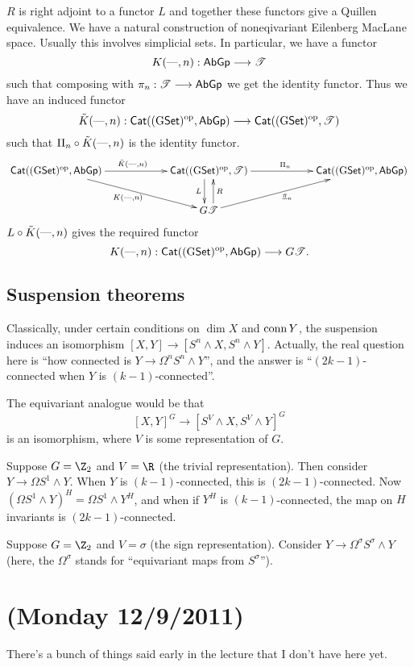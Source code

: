 \documentclass[11pt]{article}
\newcommand{\NewLecture}[3]{\section{#1 {\small(#2/#3/2011)}}}
\begin{document}
\begin{FirstNineLectures}
$R$ is right adjoint to a functor $L$ and together these functors give a Quillen equivalence. We have a natural construction of noneqivariant Eilenberg MacLane space. Usually this involves simplicial sets. In particular, we have a functor
\[K(\textup{---},n):\operatorname{{\mathsf{AbGp}}}\longrightarrow\mathscr{T}\]
such that composing with $\pi_n:\mathscr{T}\longrightarrow\operatorname{{\mathsf{AbGp}}}$ we get the identity functor. Thus we have an induced functor
\[\tilde{K}(\textup{---},n):\operatorname{{\mathsf{Cat}}}((\operatorname{{G\mathsf{Set}}})^{\textup{op}},\operatorname{{\mathsf{AbGp}}})\longrightarrow
\operatorname{{\mathsf{Cat}}}((\operatorname{{G\mathsf{Set}}})^{\textup{op}},\mathscr{T})\]
such that $\Pi_n\circ\tilde{K}(\textup{---},n)$ is the identity functor.
\[\xymatrixcolsep{5pc}\xymatrix{
\Cat
((\GSet)^{\textup{op}},\AbGp)
\ar[r]^{\tilde{K}(\DASH,n)}\ar[rd]_{K(\DASH,n)}
&\Cat
((\GSet)^{\textup{op}},\mathscr{T})\ar[r]^{\Pi_n}\ar@<-1ex>[d]_L
&\Cat
((\GSet)^{\textup{op}},\AbGp)\\
&G\mathscr{T}\ar@<-1ex>[u]_R\ar[ru]_{\underline{\pi}_n}&}\]
$L\circ\tilde{K}(\textup{---},n)$ gives the required functor
\[K(\textup{---},n):\operatorname{{\mathsf{Cat}}}((\operatorname{{G\mathsf{Set}}})^{\textup{op}},\operatorname{{\mathsf{AbGp}}})\longrightarrow
G\mathscr{T}.\]
\subsection*{Suspension theorems}
Classically, under certain conditions on $\dim X$ and $\operatorname{conn} Y$, the suspension induces an isomorphism $[X,Y]\to[S^n\wedge X,S^n\wedge Y]$. Actually, the real question here is ``how connected is $Y\to \Omega^nS^n\wedge Y$'', and the answer is ``$(2k-1)$-connected when $Y$ is $(k-1)$-connected''.

The equivariant analogue would be that
\[[X,Y]^G\to [S^V\wedge X,S^V\wedge Y]^G\]
is an isomorphism, where $V$ is some representation of $G$.
\begin{exmp*}
Suppose $G=\Z_2$ and $V=\R$ (the trivial representation). Then consider $Y\to\Omega S^1\wedge Y$. When $Y$ is $(k-1)$-connected, this is $(2k-1)$-connected.
Now $(\Omega S^1\wedge Y)^H=\Omega S^1\wedge Y^H$, and when if $Y^H$ is $(k-1)$-connected, the map on $H$ invariants is $(2k-1)$-connected.
\end{exmp*}
\begin{exmp*}
Suppose $G=\Z_2$ and $V=\sigma$ (the sign representation). Consider $Y\to \Omega^\sigma S^\sigma\wedge Y$ (here, the $\Omega^\sigma$ stands for ``equivariant maps from $S^\sigma$'').
\end{exmp*}
\NewLecture{}{Monday 12}{9}
There's a bunch of things said early in the lecture that I don't have here yet.

\end{FirstNineLectures}
\end{document}
